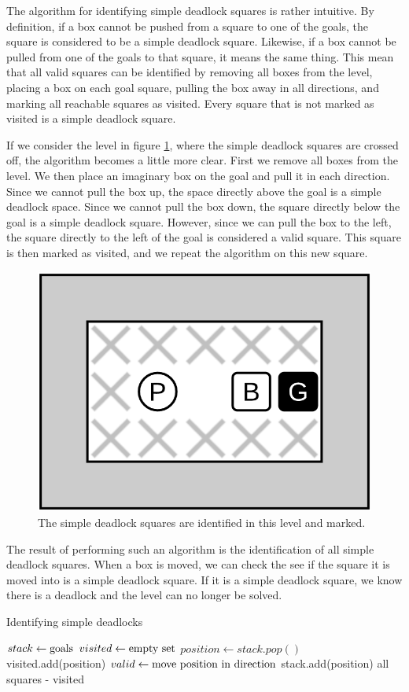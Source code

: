 \documentclass[times, 10pt,twocolumn]{article}
\begin{document}
The algorithm for identifying simple deadlock squares is rather intuitive. By definition, if a box cannot be pushed from a square to one of the goals, the square is considered to be a simple deadlock square. Likewise, if a box cannot be pulled from one of the goals to that square, it means the same thing. This mean that all valid squares can be identified by removing all boxes from the level, placing a box on each goal square, pulling the box away in all directions, and marking all reachable squares as visited. Every square that is not marked as visited is a simple deadlock square. 

If we consider the level in figure \ref{fig:sd}, where the simple deadlock squares are crossed off, the algorithm becomes a little more clear. First we remove all boxes from the level. We then place an imaginary box on the goal and pull it in each direction. Since we cannot pull the box up, the space directly above the goal is a simple deadlock space. Since we cannot pull the box down, the square directly below the goal is a simple deadlock square. However, since we can pull the box to the left, the square directly to the left of the goal is considered a valid square. This square is then marked as visited, and we repeat the algorithm on this new square. 

\begin{figure}[h] 
  \centering
     \includegraphics[width=0.5\linewidth]{images/simple_deadlock.png}
  \caption{The simple deadlock squares are identified in this level and marked.}
  \label{fig:sd}
\end{figure}

The result of performing such an algorithm is the identification of all simple deadlock squares. When a box is moved, we can check the see if the square it is moved into is a simple deadlock square. If it is a simple deadlock square, we know there is a deadlock and the level can no longer be solved.

\begin{algorithm}
  \caption{Identifying simple deadlocks}
\begin{algorithmic}[1]
    \State $stack\gets \textnormal{goals}$
    \State $visited\gets \textnormal{empty set}$
      \State $position\gets stack.pop()$
      \State visited.add(position)
          \State $valid\gets \textnormal{move position in direction}$
          \State stack.add(position)
        \EndIf
      \EndFor
    \EndWhile
    \State \Return all squares - visited
  \EndFunction
  \end{algorithmic}
\end{algorithm}
\end{document}
